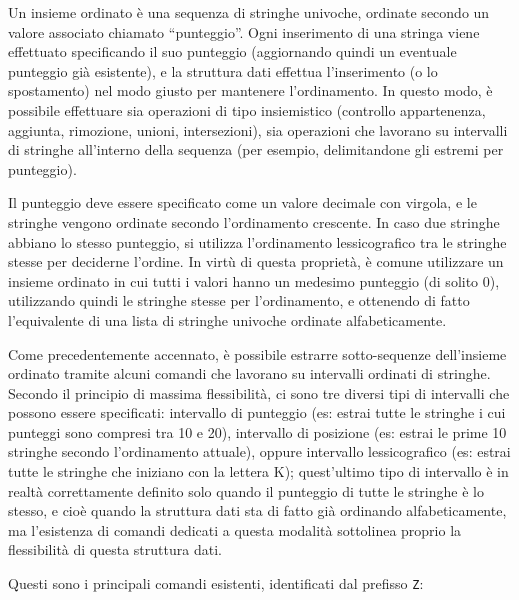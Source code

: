 Un insieme ordinato è una sequenza di stringhe univoche, ordinate secondo un valore associato
chiamato ``punteggio''. Ogni inserimento di una stringa viene effettuato specificando il suo
punteggio (aggiornando quindi un eventuale punteggio già esistente), e la struttura dati effettua
l'inserimento (o lo spostamento) nel modo giusto per mantenere l'ordinamento. In questo modo, è
possibile effettuare sia operazioni di tipo insiemistico (controllo appartenenza, aggiunta,
rimozione, unioni, intersezioni), sia operazioni che lavorano su intervalli di stringhe all'interno
della sequenza (per esempio, delimitandone gli estremi per punteggio).

Il punteggio deve essere specificato come un valore decimale con virgola, e le stringhe vengono
ordinate secondo l'ordinamento crescente. In caso due stringhe abbiano lo stesso punteggio, si
utilizza l'ordinamento lessicografico tra le stringhe stesse per deciderne l'ordine. In virtù di
questa proprietà, è comune utilizzare un insieme ordinato in cui tutti i valori hanno un medesimo
punteggio (di solito 0), utilizzando quindi le stringhe stesse per l'ordinamento, e ottenendo di
fatto l'equivalente di una lista di stringhe univoche ordinate alfabeticamente.

Come precedentemente accennato, è possibile estrarre sotto-sequenze dell'insieme ordinato tramite
alcuni comandi che lavorano su intervalli ordinati di stringhe. Secondo il principio di massima
flessibilità, ci sono tre diversi tipi di intervalli che possono essere specificati: intervallo di
punteggio (es: estrai tutte le stringhe i cui punteggi sono compresi tra 10 e 20), intervallo di
posizione (es: estrai le prime 10 stringhe secondo l'ordinamento attuale), oppure intervallo
lessicografico (es: estrai tutte le stringhe che iniziano con la lettera K); quest'ultimo tipo di
intervallo è in realtà correttamente definito solo quando il punteggio di tutte le stringhe è lo
stesso, e cioè quando la struttura dati sta di fatto già ordinando alfabeticamente, ma l'esistenza
di comandi dedicati a questa modalità sottolinea proprio la flessibilità di questa struttura dati.

Questi sono i principali comandi esistenti, identificati dal prefisso \verb|Z|:

